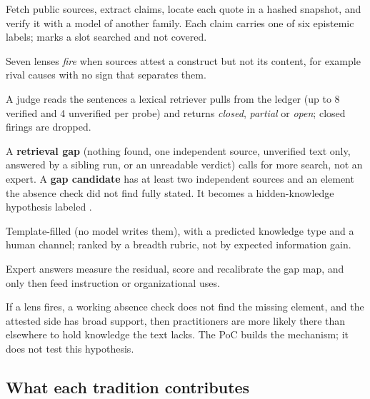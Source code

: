 \begin{description}[style=nextline, leftmargin=1.5em, itemsep=1pt, topsep=2pt]
  \item[1--2 Reconstruct into an evidence ledger] Fetch public sources, extract claims, locate each
    quote in a hashed snapshot, and verify it with a model of another family. Each claim carries one
    of six epistemic labels;  marks a slot searched and not covered.
  \item[3 Lenses] Seven lenses \emph{fire} when sources attest a construct but not its content, for
    example rival causes with no sign that separates them.
  \item[4 Absence check] A judge reads the sentences a lexical retriever pulls from the ledger (up to
    8 verified and 4 unverified per probe) and returns \emph{closed}, \emph{partial} or \emph{open};
    closed firings are dropped.
  \item[5 Triage] A \textbf{retrieval gap} (nothing found, one independent source, unverified text
    only, answered by a sibling run, or an unreadable verdict) calls for more search, not an expert.
    A \textbf{gap candidate} has at least two independent sources and an element the absence check
    did not find fully stated. It becomes a hidden-knowledge hypothesis labeled .
  \item[6 Questions] Template-filled (no model writes them), with a predicted knowledge type and a
    human channel; ranked by a breadth rubric, not by expected information gain.
  \item[7--9 Future] Expert answers measure the residual, score and recalibrate the gap map, and only
    then feed instruction or organizational uses.
\end{description}
\evhyp{} If a lens fires, a working absence check does not find the missing element, and the attested
side has broad support, then practitioners are more likely there than elsewhere to hold knowledge the
text lacks. The PoC builds the mechanism; it does not test this hypothesis.


\subsection{What each tradition contributes}\label{sec:traditions}

